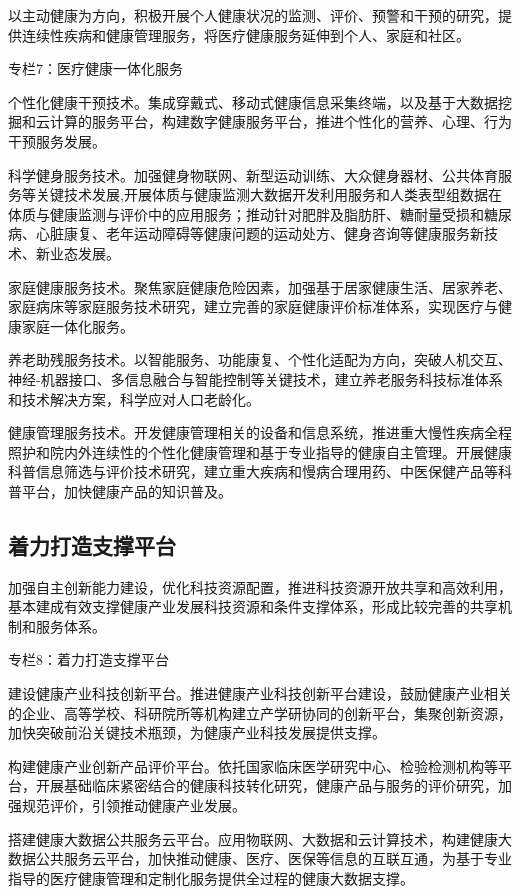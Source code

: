 \documentclass{article}
\begin{document}
以主动健康为方向，积极开展个人健康状况的监测、评价、预警和干预的研究，提供连续性疾病和健康管理服务，将医疗健康服务延伸到个人、家庭和社区。

\begin{minipage}{20em}
专栏7：医疗健康一体化服务

个性化健康干预技术。集成穿戴式、移动式健康信息采集终端，以及基于大数据挖掘和云计算的服务平台，构建数字健康服务平台，推进个性化的营养、心理、行为干预服务发展。

科学健身服务技术。加强健身物联网、新型运动训练、大众健身器材、公共体育服务等关键技术发展,开展体质与健康监测大数据开发利用服务和人类表型组数据在体质与健康监测与评价中的应用服务；推动针对肥胖及脂肪肝、糖耐量受损和糖尿病、心脏康复、老年运动障碍等健康问题的运动处方、健身咨询等健康服务新技术、新业态发展。

家庭健康服务技术。聚焦家庭健康危险因素，加强基于居家健康生活、居家养老、家庭病床等家庭服务技术研究，建立完善的家庭健康评价标准体系，实现医疗与健康家庭一体化服务。

养老助残服务技术。以智能服务、功能康复、个性化适配为方向，突破人机交互、神经-机器接口、多信息融合与智能控制等关键技术，建立养老服务科技标准体系和技术解决方案，科学应对人口老龄化。

健康管理服务技术。开发健康管理相关的设备和信息系统，推进重大慢性疾病全程照护和院内外连续性的个性化健康管理和基于专业指导的健康自主管理。开展健康科普信息筛选与评价技术研究，建立重大疾病和慢病合理用药、中医保健产品等科普平台，加快健康产品的知识普及。
\end{minipage}

\subsection{着力打造支撑平台}
加强自主创新能力建设，优化科技资源配置，推进科技资源开放共享和高效利用，基本建成有效支撑健康产业发展科技资源和条件支撑体系，形成比较完善的共享机制和服务体系。

\begin{minipage}{20em}
专栏8：着力打造支撑平台

建设健康产业科技创新平台。推进健康产业科技创新平台建设，鼓励健康产业相关的企业、高等学校、科研院所等机构建立产学研协同的创新平台，集聚创新资源，加快突破前沿关键技术瓶颈，为健康产业科技发展提供支撑。

构建健康产业创新产品评价平台。依托国家临床医学研究中心、检验检测机构等平台，开展基础临床紧密结合的健康科技转化研究，健康产品与服务的评价研究，加强规范评价，引领推动健康产业发展。

搭建健康大数据公共服务云平台。应用物联网、大数据和云计算技术，构建健康大数据公共服务云平台，加快推动健康、医疗、医保等信息的互联互通，为基于专业指导的医疗健康管理和定制化服务提供全过程的健康大数据支撑。
\end{minipage}
\end{document}
